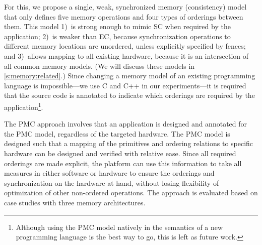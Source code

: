 For this, we propose a single, weak, synchronized memory (consistency) model that only defines five memory operations and four types of orderings between them.
This model
1)~is strong enough to mimic \acl{SC} when required by the application;
2)~is weaker than \acl{EC}, because synchronization operations to different memory locations are unordered, unless explicitly specified by fences; and
3)~allows mapping to all existing hardware, because it is an intersection of all common memory models.
(We will discuss these models in \cref{s:memory:related}.)
Since changing a memory model of an existing programming language is impossible---we use C and C++ in our experiments---it is required that the source code is annotated to indicate which orderings are required by the application\footnote{%
	Although using the \ac{PMC} model natively in the semantics of a new programming language is the best way to go, this is left as future work.}.

The \ac{PMC} approach involves that an application is designed and annotated for the \ac{PMC} model, regardless of the targeted hardware.
The \ac{PMC} model is designed such that a mapping of the primitives and ordering relations to specific hardware can be designed and verified with relative ease.
Since all required orderings are made explicit, the platform can use this information to take all measures in either software or hardware to ensure the orderings and synchronization on the hardware at hand, without losing flexibility of optimization of other non-ordered operations.
The approach is evaluated based on case studies with three memory architectures.



